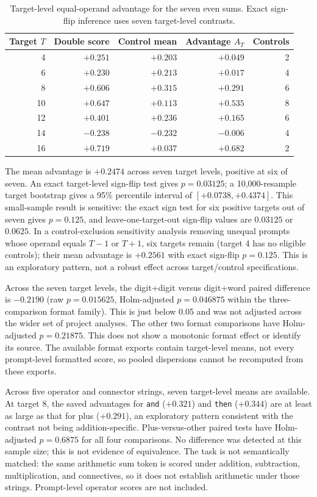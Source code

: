 \documentclass[11pt]{article}
\begin{document}
\begin{table}[t]
\centering
\caption{Target-level equal-operand advantage for the seven even sums. Exact sign-flip inference uses seven target-level contrasts.}
\label{tab:doubles-targets}
\small
\begin{tabular}{rrrrr}
\toprule
Target $T$ & Double score & Control mean & Advantage $A_T$ & Controls \\
\midrule
4  & $+0.251$ & $+0.203$ & $+0.049$ & 2 \\
6  & $+0.230$ & $+0.213$ & $+0.017$ & 4 \\
8  & $+0.606$ & $+0.315$ & $+0.291$ & 6 \\
10 & $+0.647$ & $+0.113$ & $+0.535$ & 8 \\
12 & $+0.401$ & $+0.236$ & $+0.165$ & 6 \\
14 & $-0.238$ & $-0.232$ & $-0.006$ & 4 \\
16 & $+0.719$ & $+0.037$ & $+0.682$ & 2 \\
\bottomrule
\end{tabular}
\end{table}

The mean advantage is $+0.2474$ across seven target levels, positive at six of seven. An exact target-level sign-flip test gives $p=0.03125$; a 10,000-resample target bootstrap gives a 95\% percentile interval of $[+0.0738,+0.4374]$. This small-sample result is sensitive: the exact sign test for six positive targets out of seven gives $p=0.125$, and leave-one-target-out sign-flip values are $0.03125$ or $0.0625$. In a control-exclusion sensitivity analysis removing unequal prompts whose operand equals $T-1$ or $T+1$, six targets remain (target 4 has no eligible controls); their mean advantage is $+0.2561$ with exact sign-flip $p=0.125$. This is an exploratory pattern, not a robust effect across target/control specifications.

Across the seven target levels, the digit+digit versus digit+word paired difference is $-0.2190$ (raw $p=0.015625$, Holm-adjusted $p=0.046875$ within the three-comparison format family). This is just below 0.05 and was not adjusted across the wider set of project analyses. The other two format comparisons have Holm-adjusted $p=0.21875$. This does not show a monotonic format effect or identify its source. The available format exports contain target-level means, not every prompt-level formatted score, so pooled dispersions cannot be recomputed from these exports.

Across five operator and connector strings, seven target-level means are available. At target 8, the saved advantages for \texttt{and} ($+0.321$) and \texttt{then} ($+0.344$) are at least as large as that for plus ($+0.291$), an exploratory pattern consistent with the contrast not being addition-specific. Plus-versus-other paired tests have Holm-adjusted $p=0.6875$ for all four comparisons. No difference was detected at this sample size; this is not evidence of equivalence. The task is not semantically matched: the same arithmetic sum token is scored under addition, subtraction, multiplication, and connectives, so it does not establish arithmetic under those strings. Prompt-level operator scores are not included.
\end{document}
